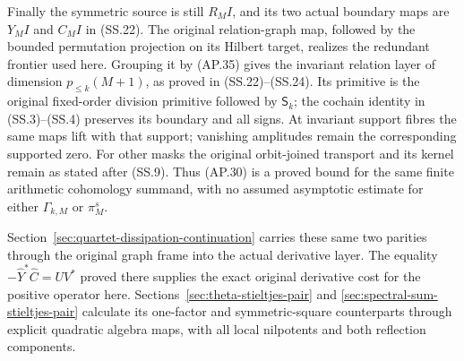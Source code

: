 Finally the symmetric source is still \(R_MI\), and its two
actual boundary maps are \(Y_MI\) and \(C_MI\) in
(SS.22).  The original relation-graph map, followed by the bounded
permutation projection on its Hilbert target, realizes the redundant
frontier used here.  Grouping it by (AP.35) gives the invariant
relation layer of dimension \(p_{\le k}(M+1)\), as proved
in (SS.22)--(SS.24).  Its primitive is the original fixed-order
division primitive followed by \(\mathsf S_k\); the cochain
identity in (SS.3)--(SS.4) preserves its boundary and all signs.
At invariant support fibres the same maps lift with that support;
vanishing amplitudes remain the corresponding supported zero.
For other masks the original orbit-joined transport and its kernel
remain as stated after (SS.9).  Thus (AP.30) is a proved bound
for the same finite arithmetic cohomology summand, with no assumed
asymptotic estimate for either \(\Gamma_{k,M}\) or
\(\pi_M^s\).


Section~\ref{sec:quartet-dissipation-continuation} carries these
same two parities through the original graph frame into the actual
derivative layer. The equality
\(-\widehat Y^*\widehat C=UV^*\) proved there supplies the
exact original derivative cost for the positive operator here.
Sections~\ref{sec:theta-stieltjes-pair} and
\ref{sec:spectral-sum-stieltjes-pair} calculate its one-factor and
symmetric-square counterparts through explicit quadratic algebra
maps, with all local nilpotents and both reflection components.
